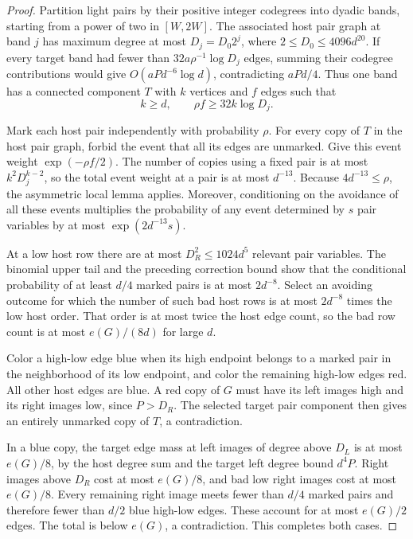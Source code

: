 \documentclass[11pt]{amsart}
\theoremstyle{definition}
\theoremstyle{remark}
\numberwithin{equation}{section}
\begin{document}
\begin{proof}
Partition light pairs by their positive integer codegrees into dyadic
bands, starting from a power of two in $[W,2W]$. The associated host
pair graph at band $j $ has maximum degree at most $ D_j=D_0 2^j$, where
$2\le D_0\le4096d^{20}$. If every target band had fewer than
$32a\rho^{-1}\log D_j$ edges, summing their codegree contributions
would give $O(aP d^{-6}\log d)$, contradicting $ aPd/4$.
Thus one band has a connected component $T $ with $ k $ vertices and $ f$
edges such that
\[
 k\ge d,\qquad \rho f\ge32k\log D_j.
\]

Mark each host pair independently with probability $\rho$. For every
copy of $T$ in the host pair graph, forbid the event that all its edges
are unmarked. Give this event weight $\exp(-\rho f/2)$.
The number of copies using a fixed pair is at most $k^2D_j^{k-2}$,
so the total event weight at a pair is at most $d^{-13}$.
Because $4d^{-13}\le\rho$, the asymmetric local lemma applies.
Moreover, conditioning on the avoidance of all these events multiplies
the probability of any event determined by $s$ pair variables by at
most $\exp(2d^{-13}s)$.

At a low host row there are at most $D_R^2\le1024d^5$ relevant pair
variables. The binomial upper tail and the preceding correction bound
show that the conditional probability of at least $d/4$ marked pairs
is at most $2d^{-8}$. Select an avoiding outcome for which the number
of such bad host rows is at most $2d^{-8}$ times the low host order.
That order is at most twice the host edge count, so the bad row count
is at most $e(G)/(8d)$ for large $ d$.

Color a high-low edge blue when its high endpoint belongs to a marked
pair in the neighborhood of its low endpoint, and color the remaining
high-low edges red. All other host edges are blue. A red copy of $G$
must have its left images high and its right images low, since $P>D_R$.
The selected target pair component then gives an entirely unmarked
copy of $T$, a contradiction.

In a blue copy, the target edge mass at left images of degree above
$D_L $ is at most $ e(G)/8$, by the host degree sum and the target left
degree bound $d^4P $. Right images above $ D_R $ cost at most $ e(G)/8$,
and bad low right images cost at most $e(G)/8$. Every remaining right
image meets fewer than $d/4$ marked pairs and therefore fewer than
$d/2$ blue high-low edges. These account for at most $ e(G)/2$ edges.
The total is below $e(G)$, a contradiction. This completes both cases.
\end{proof}
\end{document}
